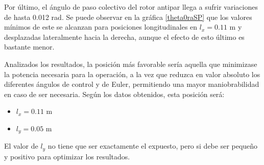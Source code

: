Por último, el ángulo de paso colectivo del rotor antipar llega a sufrir variaciones de hasta 0.012 rad. Se puede observar en la gráfica \ref{theta0raSP} que los valores mínimos de este se alcanzan para posiciones longitudinales en $l_x=0.11$ m y desplazadas lateralmente hacia la derecha, aunque el efecto de esto último es bastante menor.

Analizados los resultados, la posición más favorable sería aquella que minimizase la potencia necesaria para la operación, a la vez que reduzca en valor absoluto los diferentes ángulos de control y de Euler, permitiendo una mayor maniobrabilidad en caso de ser necesaria.
Según los datos obtenidos, esta posición será:
\begin{itemize}
	\item $l_x=0.11$ m
	\item $l_y=0.05$ m
\end{itemize}
El valor de $l_y$ no tiene que ser exactamente el expuesto, pero si debe ser pequeño y positivo para optimizar los resultados.
